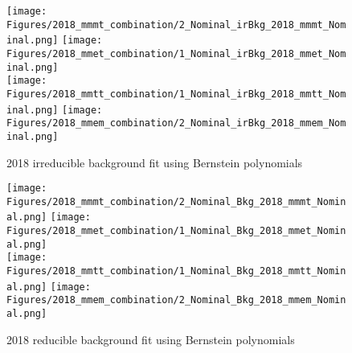\begin{figure}[ht!b]
  \centering
  \texttt{[image: Figures/2018\_mmmt\_combination/2\_Nominal\_irBkg\_2018\_mmmt\_Nominal.png]}
  \texttt{[image: Figures/2018\_mmet\_combination/1\_Nominal\_irBkg\_2018\_mmet\_Nominal.png]}\\
  \texttt{[image: Figures/2018\_mmtt\_combination/1\_Nominal\_irBkg\_2018\_mmtt\_Nominal.png]}
  \texttt{[image: Figures/2018\_mmem\_combination/2\_Nominal\_irBkg\_2018\_mmem\_Nominal.png]}\\
    \caption{\label{fig:2018_fit_ZZ} 2018 irreducible background fit using Bernstein polynomials}
\end{figure}
\begin{figure}[ht!b]
  \centering
  \texttt{[image: Figures/2018\_mmmt\_combination/2\_Nominal\_Bkg\_2018\_mmmt\_Nominal.png]}
  \texttt{[image: Figures/2018\_mmet\_combination/1\_Nominal\_Bkg\_2018\_mmet\_Nominal.png]}\\
  \texttt{[image: Figures/2018\_mmtt\_combination/1\_Nominal\_Bkg\_2018\_mmtt\_Nominal.png]}
  \texttt{[image: Figures/2018\_mmem\_combination/2\_Nominal\_Bkg\_2018\_mmem\_Nominal.png]}\\
    \caption{\label{fig:2018_fit_FF} 2018 reducible background fit using Bernstein polynomials}
\end{figure}
